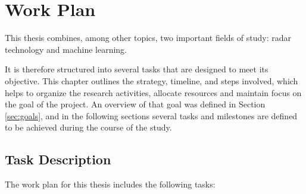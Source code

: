 
%

\chapter{Work Plan}
\label{cha:work_plan}

This thesis combines, among other topics, two important fields of study: radar technology and machine learning.

It is therefore structured into several tasks that are designed to meet its objective. This chapter outlines the strategy, timeline, and steps involved, which helps to organize the research activities, allocate resources and maintain focus on the goal of the project. An overview of that goal was defined in Section \ref{sec:goals}, and in the following sections several tasks and milestones are defined to be achieved during the course of the study.

\section{Task Description} %
\label{sec:task_description}
The work plan for this thesis includes the following tasks:

